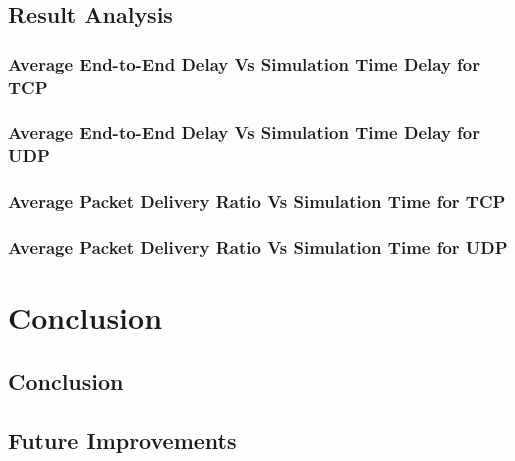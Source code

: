\documentclass[12pt,a4paper]{report}
\begin{document}
\section{Result Analysis}
\subsection{Average End-to-End Delay Vs Simulation Time Delay for TCP}
\subsection{Average End-to-End Delay Vs Simulation Time Delay for UDP}
\subsection{Average Packet Delivery Ratio Vs Simulation Time for TCP}
\subsection{Average Packet Delivery Ratio Vs Simulation Time for UDP}

\chapter{Conclusion}
\section{Conclusion}
\section{Future Improvements}
\end{document}
